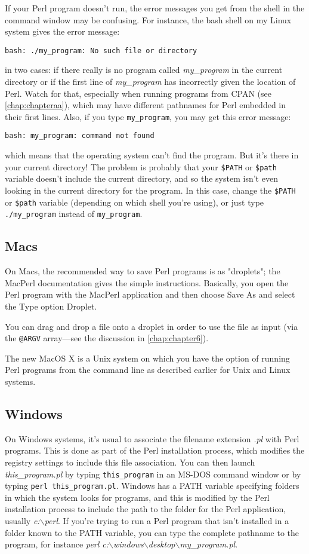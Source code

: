 If your Perl program doesn't run, the error messages you get from the shell in the command window may be confusing. For instance, the bash shell on my Linux system gives the error message:

\verb|bash: ./my_program: No such file or directory|

in two cases: if there really is no program called \textit{my\_program} in the current directory or if the first line of \textit{my\_program} has incorrectly given the location of Perl. Watch for that, especially when running programs from CPAN (see \autoref{chap:chapteraa}), which may have different pathnames for Perl embedded in their first lines. Also, if you type \verb|my_program|, you may get this error message:

\verb|bash: my_program: command not found|

which means that the operating system can't find the program. But it's
there in your current directory! The problem is probably that your
\verb|$PATH| or \verb|$path| variable doesn't include the current
directory, and so the system isn't even looking in the current directory
for the program. In this case, change the \verb|$PATH| or \verb|$path|
variable (depending on which shell you're using), or just type \verb|./my_program| instead of \verb|my_program|.  

\subsection{Macs}
On Macs, the recommended way to save Perl programs is as "droplets"; the MacPerl documentation gives the simple instructions. Basically, you open the Perl program with the MacPerl application and then choose Save As and select the Type option Droplet.

You can drag and drop a file onto a droplet in order to use the file as input (via the \verb|@ARGV| array—see the discussion in \autoref{chap:chapter6}).

The new MacOS X is a Unix system on which you have the option of running Perl programs from the command line as described earlier for Unix and Linux systems.

\subsection{Windows}
On Windows systems, it's usual to associate the filename extension \textit{.pl} with Perl programs. This is done as part of the Perl installation process, which modifies the registry settings to include this file association. You can then launch \textit{this\_program.pl} by typing \verb|this_program| in an MS-DOS command window or by typing \verb|perl this_program.pl|. Windows has a PATH variable specifying folders in which the system looks for programs, and this is modified by the Perl installation process to include the path to the folder for the Perl application, usually \textit{c:$\backslash$perl}. If you're trying to run a Perl program that isn't installed in a folder known to the PATH variable, you can type the complete pathname to the program, for instance \textit{perl c:$\backslash$windows$\backslash$desktop$\backslash$my\_program.pl}.

